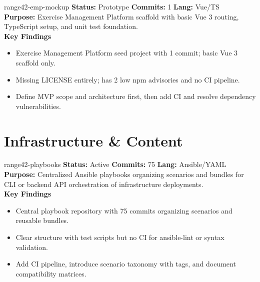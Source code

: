 \documentclass[aspectratio=169]{beamer}
\begin{document}
\begin{frame}{range42-emp-mockup \; \faChalkboardTeacher}
  \textbf{Status:} Prototype \hfill \textbf{Commits:} 1 \hfill \textbf{Lang:} Vue/TS\\[2mm]
  \textbf{Purpose:} Exercise Management Platform scaffold with basic Vue 3 routing, TypeScript setup, and unit test foundation.\\[2mm]
  \textbf{Key Findings}
  \begin{itemize}
    \item Exercise Management Platform seed project with 1 commit; basic Vue 3 scaffold only.
    \item Missing LICENSE entirely; has 2 low npm advisories and no CI pipeline.
    \item Define MVP scope and architecture first, then add CI and resolve dependency vulnerabilities.
  \end{itemize}
\end{frame}

\section{Infrastructure \& Content}

\begin{frame}{range42-playbooks \; \faCubes}
  \textbf{Status:} Active \hfill \textbf{Commits:} 75 \hfill \textbf{Lang:} Ansible/YAML\\[2mm]
  \textbf{Purpose:} Centralized Ansible playbooks organizing scenarios and bundles for CLI or backend API orchestration of infrastructure deployments.\\[2mm]
  \textbf{Key Findings}
  \begin{itemize}
    \item Central playbook repository with 75 commits organizing scenarios and reusable bundles.
    \item Clear structure with test scripts but no CI for ansible-lint or syntax validation.
    \item Add CI pipeline, introduce scenario taxonomy with tags, and document compatibility matrices.
  \end{itemize}
\end{frame}
\end{document}
